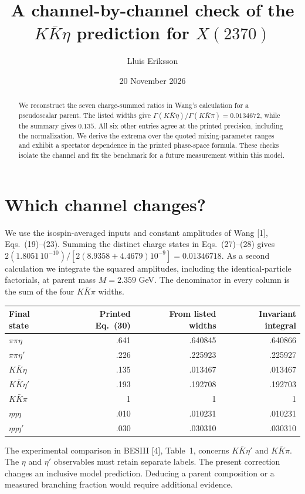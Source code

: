 \documentclass[11pt,a4paper]{article}
\title{A channel-by-channel check of the $K\bar K\eta$ prediction for $X(2370)$}
\author{Lluis Eriksson}
\date{20 November 2026}
\begin{document}
\maketitle
\begin{abstract}
We reconstruct the seven charge-summed ratios in Wang's calculation for a pseudoscalar parent. The listed widths give $\Gamma(K\bar K\eta)/\Gamma(K\bar K\pi)=0.0134672$, while the summary gives $0.135$. All six other entries agree at the printed precision, including the normalization. We derive the extrema over the quoted mixing-parameter ranges and exhibit a spectator dependence in the printed phase-space formula. These checks isolate the channel and fix the benchmark for a future measurement within this model.
\end{abstract}

\section*{Which channel changes?}
We use the isospin-averaged inputs and constant amplitudes of Wang [1], Eqs.~(19)--(23). Summing the distinct charge states in Eqs.~(27)--(28) gives $2(1.8051\,10^{-10})/[2(8.9358+4.4679)10^{-9}]=0.01346718$. As a second calculation we integrate the squared amplitudes, including the identical-particle factorials, at parent mass $M=2.359$ GeV. The denominator in every column is the sum of the four $K\bar K\pi$ widths.
\begin{center}
\begin{tabular}{lrrr}\toprule
Final state & Printed Eq.~(30) & From listed widths & Invariant integral\\\midrule
$\pi\pi\eta$ & .641 & .640845 & .640866\\
$\pi\pi\eta'$ & .226 & .225923 & .225927\\
$K\bar K\eta$ & .135 & .013467 & .013467\\
$K\bar K\eta'$ & .193 & .192708 & .192703\\
$K\bar K\pi$ & 1 & 1 & 1\\
$\eta\eta\eta$ & .010 & .010231 & .010231\\
$\eta\eta\eta'$ & .030 & .030310 & .030310\\\bottomrule
\end{tabular}
\end{center}
The experimental comparison in BESIII [4], Table~1, concerns $K\bar K\eta'$ and $K\bar K\pi$. The $\eta$ and $\eta'$ observables must retain separate labels. The present correction changes an inclusive model prediction. Deducing a parent composition or a measured branching fraction would require additional evidence.
\end{document}
